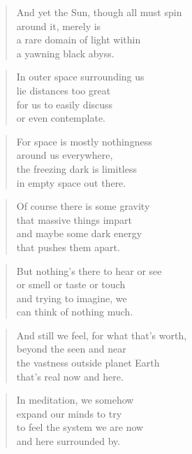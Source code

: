 \documentclass[10pt,a4paper]{article}
\begin{document}
\begin{multicols}{2}
\begin{verse}
And yet the Sun, though all must spin\\
around it, merely is\\
a rare domain of light within\\
a yawning black abyss.
\end{verse}

\begin{verse}
In outer space surrounding us\\
lie distances too great\\
for us to easily discuss\\
or even contemplate.
\end{verse}

\begin{verse}
For space is mostly nothingness\\
around us everywhere,\\
the freezing dark is limitless\\
in empty space out there.
\end{verse}

\begin{verse}
Of course there is some gravity\\
that massive things impart\\
and maybe some dark energy\\
that pushes them apart.
\end{verse}

\begin{verse}
But nothing’s there to hear or see\\
or smell or taste or touch\\
and trying to imagine, we\\
can think of nothing much.
\end{verse}

\begin{verse}
And still we feel, for what that’s worth,\\
beyond the seen and near\\
the vastness outside planet Earth\\
that’s real now and here.
\end{verse}

\begin{verse}
In meditation, we somehow\\
expand our minds to try\\
to feel the system we are now\\
and here surrounded by.
\end{verse}


\end{multicols}
\end{document}
